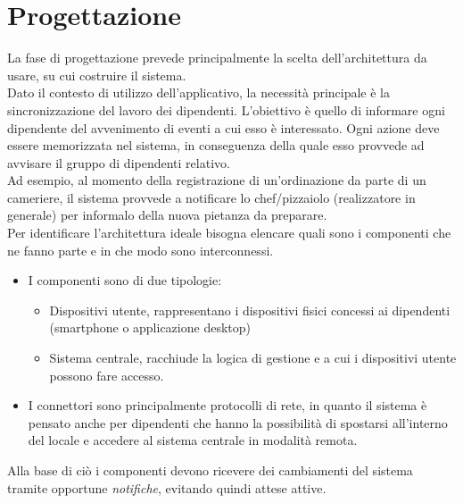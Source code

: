 \chapter{Progettazione}
La fase di progettazione prevede principalmente la scelta dell'architettura da usare, su cui costruire il sistema. 
\\Dato il contesto di utilizzo dell'applicativo, la necessità principale è la sincronizzazione del lavoro dei dipendenti. L'obiettivo è quello di informare ogni dipendente del avvenimento di eventi a cui esso è interessato. Ogni azione deve essere memorizzata nel sistema, in conseguenza della quale esso provvede ad avvisare il gruppo di dipendenti relativo.
\\Ad esempio, al momento della registrazione di un'ordinazione da parte di un cameriere, il sistema provvede a notificare lo chef/pizzaiolo (realizzatore in generale) per informalo della nuova pietanza da preparare.
\\Per identificare l'architettura ideale bisogna elencare quali sono i componenti che ne fanno parte e in che modo sono interconnessi.
\begin{itemize}
	\item I componenti sono di due tipologie:
		\begin{itemize}
			\item Dispositivi utente, rappresentano i dispositivi fisici concessi ai dipendenti (smartphone o applicazione desktop)
			\item Sistema centrale, racchiude la logica di gestione e a cui i dispositivi utente possono fare accesso.
		\end{itemize}
	\item I connettori sono principalmente protocolli di rete, in quanto il sistema è pensato anche per dipendenti che hanno la possibilità di spostarsi all'interno del locale e accedere al sistema centrale in modalità remota.
\end{itemize}
Alla base di ciò i componenti devono ricevere dei cambiamenti del sistema tramite opportune \textit{notifiche}, evitando quindi attese attive.

